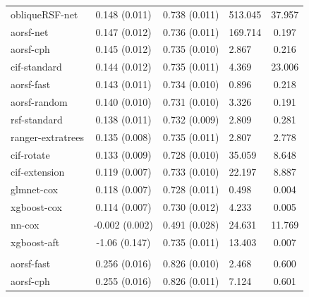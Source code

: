 \documentclass[twoside,11pt]{article}\usepackage[]{graphicx}\usepackage[]{xcolor}
\newenvironment{knitrout}{}{} %
\begin{document}
\begin{knitrout}
\begin{longtable}[t]{lcclc}
\hline
\hspace{1em}obliqueRSF-net & 0.148 (0.011) & 0.738 (0.011) & 513.045 & 37.957\\
\hspace{1em}aorsf-net & 0.147 (0.012) & 0.736 (0.011) & 169.714 & 0.197\\
\hspace{1em}aorsf-cph & 0.145 (0.012) & 0.735 (0.010) & 2.867 & 0.216\\
\hspace{1em}cif-standard & 0.144 (0.012) & 0.735 (0.011) & 4.369 & 23.006\\
\hspace{1em}aorsf-fast & 0.143 (0.011) & 0.734 (0.010) & 0.896 & 0.218\\
\hspace{1em}aorsf-random & 0.140 (0.010) & 0.731 (0.010) & 3.326 & 0.191\\
\hspace{1em}rsf-standard & 0.138 (0.011) & 0.732 (0.009) & 2.809 & 0.281\\
\hspace{1em}ranger-extratrees & 0.135 (0.008) & 0.735 (0.011) & 2.807 & 2.778\\
\hspace{1em}cif-rotate & 0.133 (0.009) & 0.728 (0.010) & 35.059 & 8.648\\
\hspace{1em}cif-extension & 0.119 (0.007) & 0.733 (0.010) & 22.197 & 8.887\\
\hspace{1em}glmnet-cox & 0.118 (0.007) & 0.728 (0.011) & 0.498 & 0.004\\
\hspace{1em}xgboost-cox & 0.114 (0.007) & 0.730 (0.012) & 4.233 & 0.005\\
\hspace{1em}nn-cox & -0.002 (0.002) & 0.491 (0.028) & 24.631 & 11.769\\
\hspace{1em}xgboost-aft & -1.06 (0.147) & 0.735 (0.011) & 13.403 & 0.007\\
\addlinespace[0.3em]
\hline
\multicolumn{5}{l}{\textit{\textbf{Serum free light chain; death, n = 7874, p = 10}}}\\
\hline
\hspace{1em}aorsf-fast & 0.256 (0.016) & 0.826 (0.010) & 2.468 & 0.600\\
\hspace{1em}aorsf-cph & 0.255 (0.016) & 0.826 (0.011) & 7.124 & 0.601\\

\end{longtable}
\end{knitrout}
\end{document}
